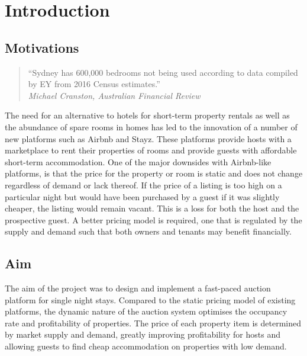 \section{Introduction}

\subsection{Motivations}

\smallskip
\begin{quote}
  ``Sydney has 600,000 bedrooms not being used according to data
compiled by EY from 2016 Census estimates.'' \\
  \hspace*{\fill}\emph{Michael Cranston, Australian Financial Review}
\end{quote}

The need for an alternative to hotels for short-term property rentals as well
as the abundance of spare rooms in homes has led to the innovation of
a number of new platforms such as Airbnb and Stayz.
These platforms provide hosts with a marketplace to rent their properties of rooms and
provide guests with affordable short-term accommodation. One of the major downsides
with Airbnb-like platforms, is that
the price for the property or room is static and does not change regardless
of demand or lack thereof. If the price of a listing is too high on a particular night
but would have been purchased by a guest if it was slightly cheaper, the listing would
remain vacant. This is a loss for both the host and the prospective guest. A better
pricing model is required, one that is regulated by the supply and demand such that
both owners and tenants may benefit financially.

\subsection{Aim}
The aim of the project was to design and implement a fast-paced auction
platform for single night stays. Compared to the static pricing
model of existing platforms, the dynamic nature of the auction system
optimises the occupancy rate and profitability of properties.
The price of each property item is determined
by market supply and demand, greatly improving profitability for hosts and
allowing guests to find cheap accommodation on properties with low demand.

